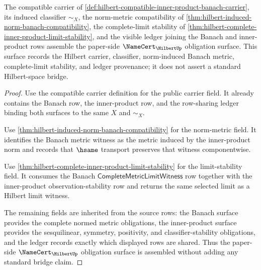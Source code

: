\begin{theorem}
\label{thm:hilbert-namecert-obligation-surface}
The compatible carrier of
\autoref{def:hilbert-compatible-inner-product-banach-carrier}, its induced
classifier $\sim_X$, the norm-metric compatibility of
\autoref{thm:hilbert-induced-norm-banach-compatibility}, the complete-limit
stability of \autoref{thm:hilbert-complete-inner-product-limit-stability}, and
the visible ledger joining the Banach and inner-product rows assemble the
paper-side $\NameCert_{\HilbertUp}$ obligation surface. This surface records
the Hilbert carrier, classifier, norm-induced Banach metric, complete-limit
stability, and ledger provenance; it does not assert a standard
Hilbert-space bridge.
\end{theorem}
\begin{proof}
Use the compatible carrier definition for the public carrier field. It
already contains the Banach row, the inner-product row, and the row-sharing
ledger binding both surfaces to the same $X$ and $\sim_X$.

Use \autoref{thm:hilbert-induced-norm-banach-compatibility} for the
norm-metric field. It identifies the Banach metric witness as the metric
induced by the inner-product norm and records that $\hsame$ transport
preserves that witness componentwise.

Use \autoref{thm:hilbert-complete-inner-product-limit-stability} for the
limit-stability field. It consumes the Banach
$\mathsf{CompleteMetricLimitWitness}$ row together with the inner-product
observation-stability row and returns the same selected limit as a Hilbert
limit witness.

The remaining fields are inherited from the source rows: the Banach surface
provides the complete normed metric obligations, the inner-product surface
provides the sesquilinear, symmetry, positivity, and classifier-stability
obligations, and the ledger records exactly which displayed rows are shared.
Thus the paper-side $\NameCert_{\HilbertUp}$ obligation surface is assembled
without adding any standard bridge claim.
\end{proof}

